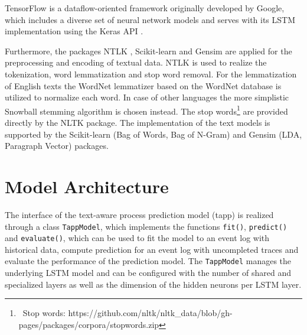 TensorFlow \cite{DBLP:journals/corr/AbadiABBCCCDDDG16} is a dataflow-oriented framework originally developed by Google, which includes a diverse set of neural network models and serves with its LSTM implementation using the Keras API \cite{chollet2015keras}.

Furthermore, the packages NTLK \cite{DBLP:books/daglib/0022921}, Scikit-learn \cite{DBLP:journals/jmlr/PedregosaVGMTGBPWDVPCBPD11} and Gensim \cite{rehurek_lrec} are applied for the preprocessing and encoding of textual data.
NTLK is used to realize the tokenization, word lemmatization and stop word removal.
For the lemmatization of English texts the WordNet lemmatizer based on the WordNet database \cite{miller1998wordnet} is utilized to normalize each word.
In case of other languages the more simplistic Snowball stemming algorithm \cite{porter2001snowball} is chosen instead.
The stop words\footnote{\, Stop words: https://github.com/nltk/nltk\_data/blob/gh-pages/packages/corpora/stopwords.zip} are provided directly by the NLTK package.
The implementation of the text models is supported by the Scikit-learn (Bag of Words, Bag of N-Gram) and Gensim (LDA, Paragraph Vector) packages.


\section{Model Architecture}\label{sec:model-implementation}

The interface of the text-aware process prediction model (tapp) is realized through a class \texttt{TappModel}, which implements the functions \texttt{fit()},  \texttt{predict()} and  \texttt{evaluate()}, which can be used to fit the model to an event log with historical data, compute prediction for an event log with uncompleted traces and evaluate the performance of the prediction model.
The \texttt{TappModel} manages the underlying LSTM model and can be configured with the number of shared and specialized layers as well as the dimension of the hidden neurons per LSTM layer.

